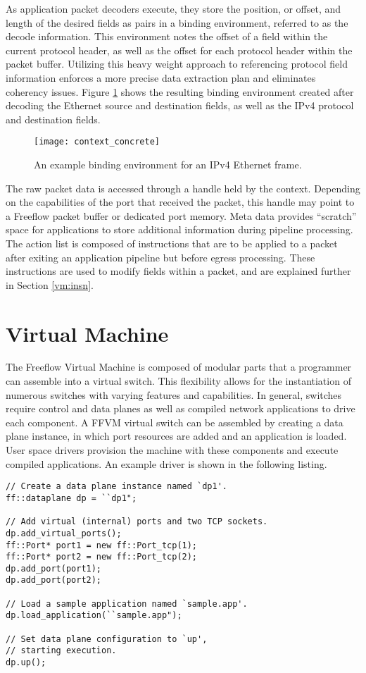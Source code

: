 As application packet decoders execute, they store the position, or offset, and
length of the desired fields as pairs in a binding environment, referred to as
the decode information. This environment notes the offset of a field within the
current protocol header, as well as the offset for each protocol header within
the packet buffer. Utilizing this heavy weight approach to referencing protocol
field information enforces a more precise data extraction plan and eliminates
coherency issues. Figure \ref{context_binding} shows the resulting binding
environment created after decoding the Ethernet source and destination fields,
as well as the IPv4 protocol and destination fields.

\begin{figure}[h!]
\centering
\texttt{[image: context\_concrete]}
\caption{An example binding environment for an IPv4 Ethernet frame.}
\label{context_binding}
\end{figure}

The raw packet data is accessed through a handle held by the context. Depending
on the capabilities of the port that received the packet, this handle may point
to a Freeflow packet buffer or dedicated port memory. Meta data provides
``scratch'' space for applications to store additional information during
pipeline processing. The action list is composed of instructions that are to
be applied to a packet after exiting an application pipeline but before egress
processing. These instructions are used to modify fields within a packet, and
are explained further in Section \ref{vm:insn}.

\section{Virtual Machine}
\label{vm}
The Freeflow Virtual Machine is composed of modular parts that a programmer can
assemble into a virtual switch. This flexibility allows for the instantiation
of numerous switches with varying features and capabilities. In general,
switches require control and data planes as well as compiled network
applications to drive each component. A FFVM virtual switch can be assembled
by creating a data plane instance, in which port resources are added and an
application is loaded. User space drivers provision the machine with these
components and execute compiled applications. An example driver is shown in the
following listing.

\begin{lstlisting}
// Create a data plane instance named `dp1'.
ff::dataplane dp = ``dp1";

// Add virtual (internal) ports and two TCP sockets.
dp.add_virtual_ports();
ff::Port* port1 = new ff::Port_tcp(1);
ff::Port* port2 = new ff::Port_tcp(2);
dp.add_port(port1);
dp.add_port(port2);

// Load a sample application named `sample.app'.
dp.load_application(``sample.app");

// Set data plane configuration to `up',
// starting execution.
dp.up();
\end{lstlisting}

